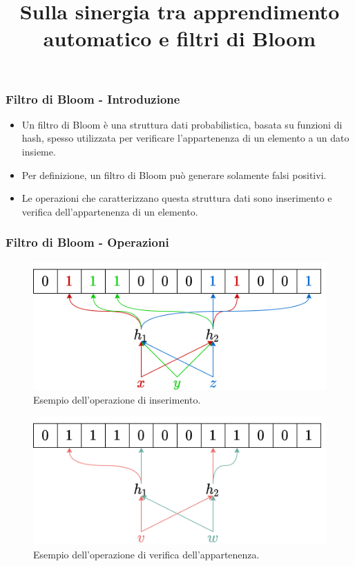 \documentclass{beamer}
\title{Sulla sinergia tra apprendimento automatico e filtri di Bloom}
\author{{Candidato: Giacomo Fumagalli}\\
{\and} \\
{Relatore: Prof. Dario Malchiodi} \\ {Correlatore: Prof. Marco Frasca}}
\date{}
\begin{document}
\frame{\titlepage}

\begin{frame}
\frametitle{Filtro di Bloom - Introduzione}
\begin{itemize}
    \item Un filtro di Bloom \cite{Bloom1970SpacetimeTI} è una struttura dati probabilistica, basata su funzioni di hash, spesso utilizzata per verificare l'appartenenza di un elemento a un dato insieme.
    \item Per definizione, un filtro di Bloom può generare solamente falsi positivi.
    \item Le operazioni che caratterizzano questa struttura dati sono inserimento e verifica dell'appartenenza di un elemento.
\end{itemize}
\end{frame}

\begin{frame}
\frametitle{Filtro di Bloom - Operazioni}
\centering
\begin{figure}[t!]
    \includegraphics[height=\dimexpr0.4\textheight-0.5in]{immagini/3/bloomFilterInserimento.png}
    \caption{Esempio dell'operazione di inserimento.}
\end{figure}
\begin{figure}[t!]
    \includegraphics[height=\dimexpr0.4\textheight-0.5in]{immagini/3/bloomFilterCheck.png}
    \caption{Esempio dell'operazione di verifica dell'appartenenza.}
\end{figure}
\end{frame}
\end{document}

